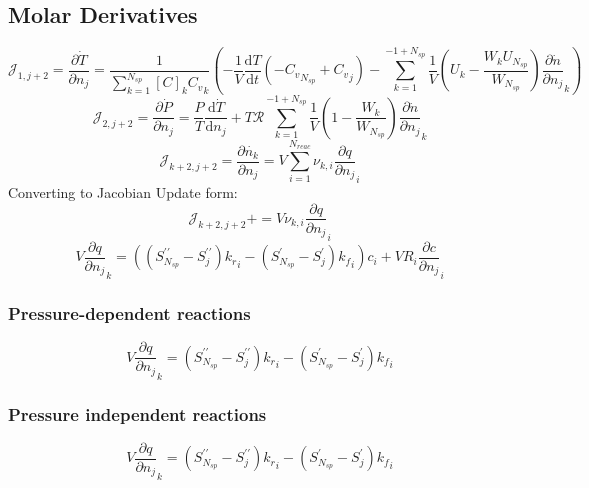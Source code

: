 \documentclass[a4paper,10pt]{article}
\newcommand{\pluseq}{\mathrel{{+}{=}}}
\newcommand{\ns}{N_{sp}}
\newcommand{\nr}{N_{reac}}
\newcommand{\Ru}{\mathcal{R}}
\begin{document}
\subsection{Molar Derivatives}
\begin{dmath} \mathcal{J}_{1,j + 2} = \frac{\partial\dot{T}}{\partial{n_j}} = \frac{1}{\sum_{k=1}^{\ns} [C]_{k} {C_v}_{k}} \left(- \frac{1}{V} \frac{\text{d} T }{\text{d} t } \left(- {C_v}_{\ns} + {C_v}_{j}\right) - \sum_{k=1}^{-1 + \ns} \frac{1}{V} \left(U_{k} - \frac{W_{k} U_{\ns}}{W_{\ns}}\right) \frac{\partial \dot{n} }{\partial {n_j} }_{k}\right)\end{dmath} 
\begin{dmath} \mathcal{J}_{2,j + 2} = \frac{\partial \dot{ P } }{\partial {n_j} } = \frac{P}{T} \frac{\text{d} \dot{T} }{\text{d} {n_j} } + T \Ru \sum_{k=1}^{-1 + \ns} \frac{1}{V} \left(1 - \frac{W_{k}}{W_{\ns}}\right) \frac{\partial \dot{n} }{\partial {n_j} }_{k}\end{dmath} 
\begin{dmath} \mathcal{J}_{k + 2,j + 2} = \frac{\partial \dot{n_k} }{\partial n_{j} } = V \sum_{i=1}^{\nr} \nu_{k,i} \frac{\partial q }{\partial {n_j} }_{i}\end{dmath} 
Converting to Jacobian Update form:
\begin{dmath} \mathcal{J}_{k + 2,j + 2}\pluseq V \nu_{k,i} \frac{\partial q }{\partial {n_j} }_{i}\end{dmath} 
\begin{dmath} V \frac{\partial q }{\partial {n_j} }_{k} = \left(\left(S^{\prime\prime}_{\ns} - S^{\prime\prime}_{j}\right) {k_r}_{i} - \left(S^{\prime}_{\ns} - S^{\prime}_{j}\right) {k_f}_{i}\right) c_{i} + V R_{i} \frac{\partial c }{\partial {n_j} }_{i}\end{dmath} 
\subsubsection{Pressure-dependent reactions}
\begin{dmath} V \frac{\partial q }{\partial {n_j} }_{k} = \left(S^{\prime\prime}_{\ns} - S^{\prime\prime}_{j}\right) {k_r}_{i} - \left(S^{\prime}_{\ns} - S^{\prime}_{j}\right) {k_f}_{i}\end{dmath} 
\subsubsection{Pressure independent reactions}
\begin{dmath} V \frac{\partial q }{\partial {n_j} }_{k} = \left(S^{\prime\prime}_{\ns} - S^{\prime\prime}_{j}\right) {k_r}_{i} - \left(S^{\prime}_{\ns} - S^{\prime}_{j}\right) {k_f}_{i}\end{dmath} 
\end{document}
